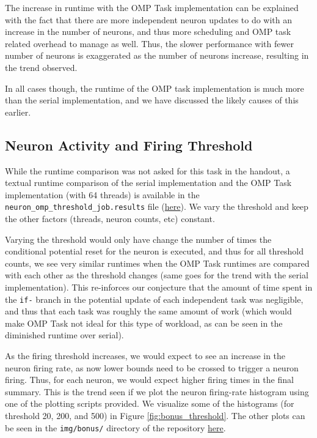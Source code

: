 \documentclass[a4paper,10pt]{article}
\begin{document}
The increase in runtime with the OMP Task implementation can be explained with the fact that there are more independent neuron updates to do with an increase in the number of neurons, and thus more scheduling and OMP task related overhead to manage as well. Thus, the slower performance with fewer number of neurons is exaggerated as the number of neurons increase, resulting in the trend observed. 

In all cases though, the runtime of the OMP task implementation is much more than the serial implementation, and we have discussed the likely causes of this earlier. 

\subsection{Neuron Activity and Firing Threshold}
While the runtime comparison was not asked for this task in the handout, a textual runtime comparison of the serial implementation and the OMP Task implementation (with 64 threads) is available in the \verb|neuron_omp_threshold_job.results| file (\href{https://github.com/paulmyr/DD2356-MethodsHPC/blob/master/3_open_mp/bonus/neuron/outputs/neuron_omp_threshold_job.results}{here}). We vary the threshold and keep the other factors (threads, neuron counts, etc) constant. 

Varying the threshold would only have change the number of times the conditional potential reset for the neuron is executed, and thus for all threshold counts, we see very similar runtimes when the OMP Task runtimes are compared with each other as the threshold changes (same goes for the trend with the serial implementation). This re-inforces our conjecture that the amount of time spent in the \verb|if-| branch in the potential update of each independent task was negligible, and thus that each task was roughly the same amount of work (which would make OMP Task not ideal for this type of workload, as can be seen in the diminished runtime over serial). 

As the firing threshold increases, we would expect to see an increase in the neuron firing rate, as now lower bounds need to be crossed to trigger a neuron firing. Thus, for each neuron, we would expect higher firing times in the final summary. This is the trend seen if we plot the neuron firing-rate histogram using one of the plotting scripts provided. We visualize some of the histograms (for threshold 20, 200, and 500) in Figure \ref{fig:bonus_threshold}. The other plots can be seen in the \verb|img/bonus/| directory of the repository \href{https://github.com/paulmyr/DD2356-MethodsHPC/tree/master/3_open_mp/img/bonus}{here}.
\end{document}
